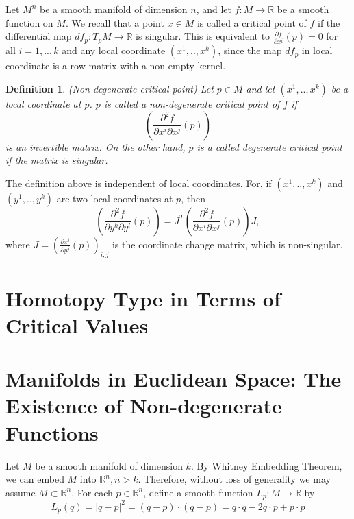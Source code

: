 \documentclass[12pt]{article}
\newtheorem{defn}[thm]{Definition}
\newcommand{\RR}{\mathbb{R}}      %
\begin{document}
Let $M^n$ be a smooth manifold of dimension $n$, and let $f: M \to \RR$ be a
smooth function on $M$. We recall that a point $x \in M$ is called a critical
point of $f$ if the differential map $ df_p : T_pM \to \RR $ is singular. This
is equivalent to $\frac{\partial f}{\partial x^i} (p) = 0$ for all $i = 1,
.. ,k$ and any local coordinate $(x^1, .., x^k)$, since the map $df_p$ in local
coordinate is a row matrix with a non-empty kernel.

\begin{defn}
  (Non-degenerate critical point) Let $p \in M$ and let $(x^1, .., x^k)$ be a
  local coordinate at $p$. $p$ is called a non-degenerate critical point of $f$
  if
  \begin{equation}
    \left( \frac{\partial^2 f}{\partial x^i \partial x^j} (p) \right)
  \end{equation}
  is an invertible matrix. On the other hand, $p$ is a called degenerate
  critical point if the matrix is singular.
\end{defn}

The definition above is independent of local coordinates. For, if $(x^1, ..,
x^k)$ and $(y^1, .., y^k)$ are two local coordinates at $p$, then
\begin{equation}
      \left( \frac{\partial^2 f}{\partial y^k \partial y^l} (p) \right) =
      J^T\left( \frac{\partial^2 f}{\partial x^i \partial x^j} (p) \right)J,
\end{equation}
where $J = \left( \frac{\partial x^i}{\partial y^j}(p) \right)_{i,j}$ is the
coordinate change matrix, which is non-singular.

\section{Homotopy Type in Terms of Critical Values}


\section{Manifolds in Euclidean Space: The Existence of Non-degenerate
  Functions}

Let $M$ be a smooth manifold of dimension $k$. By Whitney Embedding Theorem, we
can embed $M$ into $\RR^n, n > k$. Therefore, without loss of generality we may
assume $M \subset \RR^n$. For each $p \in \RR^n$, define a smooth function $L_p
: M \to \RR $ by
\begin{equation}
  L_p(q) = |q-p|^2 = (q-p) \cdot (q-p) = q\cdot q-2q \cdot p + p \cdot p
\end{equation}
\end{document}
